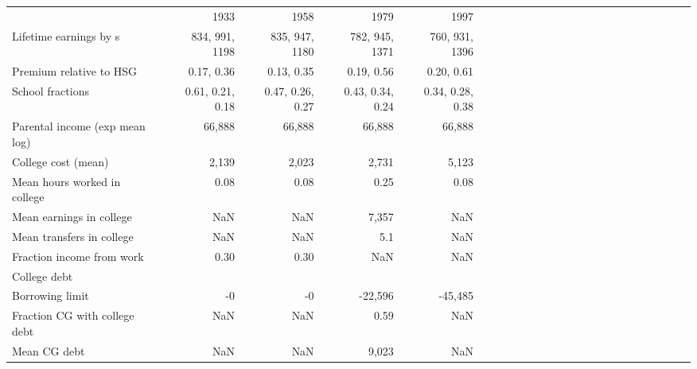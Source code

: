 \begin{tabular}{lrrrrrrrrrrrrrrrrrrrrrrr}
\hline
 & 1933  & 1958  & 1979  & 1997  &   &   &   &   &   &   &   &   &   &   &   &   &   &   &   &   &   &   &   \\ 
Lifetime earnings by s & 834, 991, 1198  & 835, 947, 1180  & 782, 945, 1371  & 760, 931, 1396  &   &   &   &   &   &   &   &   &   &   &   &   &   &   &   &   &   &   &   \\ 
Premium relative to HSG & 0.17, 0.36  & 0.13, 0.35  & 0.19, 0.56  & 0.20, 0.61  &   &   &   &   &   &   &   &   &   &   &   &   &   &   &   &   &   &   &   \\ 
School fractions & 0.61, 0.21, 0.18  & 0.47, 0.26, 0.27  & 0.43, 0.34, 0.24  & 0.34, 0.28, 0.38  &   &   &   &   &   &   &   &   &   &   &   &   &   &   &   &   &   &   &   \\ 
Parental income (exp mean log) & 66,888  & 66,888  & 66,888  & 66,888  &   &   &   &   &   &   &   &   &   &   &   &   &   &   &   &   &   &   &   \\ 
College cost (mean) & 2,139  & 2,023  & 2,731  & 5,123  &   &   &   &   &   &   &   &   &   &   &   &   &   &   &   &   &   &   &   \\ 
Mean hours worked in college & 0.08  & 0.08  & 0.25  & 0.08  &   &   &   &   &   &   &   &   &   &   &   &   &   &   &   &   &   &   &   \\ 
Mean earnings in college & NaN  & NaN  & 7,357  & NaN  &   &   &   &   &   &   &   &   &   &   &   &   &   &   &   &   &   &   &   \\ 
Mean transfers in college & NaN  & NaN  & 5.1  & NaN  &   &   &   &   &   &   &   &   &   &   &   &   &   &   &   &   &   &   &   \\ 
Fraction income from work & 0.30  & 0.30  & NaN  & NaN  &   &   &   &   &   &   &   &   &   &   &   &   &   &   &   &   &   &   &   \\ 
College debt &   &   &   &   &   &   &   &   &   &   &   &   &   &   &   &   &   &   &   &   &   &   &   \\ 
Borrowing limit & -0  & -0  & -22,596  & -45,485  &   &   &   &   &   &   &   &   &   &   &   &   &   &   &   &   &   &   &   \\ 
Fraction CG with college debt & NaN  & NaN  & 0.59  & NaN  &   &   &   &   &   &   &   &   &   &   &   &   &   &   &   &   &   &   &   \\ 
Mean CG debt & NaN  & NaN  & 9,023  & NaN  &   &   &   &   &   &   &   &   &   &   &   &   &   &   &   &   &   &   &   \\ 
\hline
\end{tabular}%
